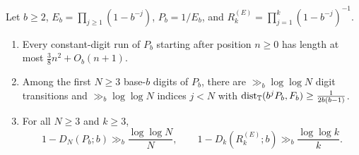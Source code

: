 \documentclass[11pt]{article}
\begin{document}
\begin{theorem}\label{thm:euler}
Let $b\ge2$, $E_b=\prod_{j\ge1}(1-b^{-j})$, $P_b=1/E_b$, and $R_k^{(E)}=\prod_{j=1}^k(1-b^{-j})^{-1}$.
\begin{enumerate}[label=\textup{(\alph*)},nosep]
\item Every constant-digit run of $P_b$ starting after position $n\ge0$ has length at most $\frac38n^2+O_b(n+1)$.
\item Among the first $N\ge3$ base-$b$ digits of $P_b$, there are $\gg_b\log\log N$ digit transitions and $\gg_b\log\log N$ indices $j<N$ with $\operatorname{dist}_{\mathbb T}(b^jP_b,F_b)\ge\frac{1}{2b(b-1)}$.
\item For all $N\ge3$ and $k\ge3$,
\[
1-D_N(P_b;b)\gg_b\frac{\log\log N}{N},\qquad
1-D_k(R_k^{(E)};b)\gg_b\frac{\log\log k}{k}.
\]
\end{enumerate}
\end{theorem}
\end{document}
